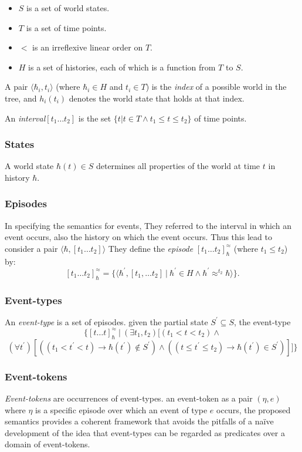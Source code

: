 \begin{itemize}
	\item $S$ is a set of world states.
	\item $T$ is a set of time points.
	\item $<$ is an irreflexive linear order on $T$.
	\item $H$ is a set of histories, each of which is a function from $T$ to $S$.
\end{itemize}

A pair $\langle \hbar_i, t_i \rangle$ (where $\hbar_i \in H$ and $t_i \in T$) is the \textit{index} of a possible world in the tree, and $h_i(t_i)$ denotes the world state that holds at that index.

An \textit{interval}$[t_1 \dots t_2]$ is the set $\{ t | t \in T \land t_1 \leq t \leq t_2\}$ of time points.


\subsubsection{States}
A world state $\hbar(t) \in S$ determines all properties of the world at time $t$ in history $\hbar$.

\subsubsection{Episodes}
In specifying the semantics for events, They referred to the interval in which an event occurs, also the history on which the event occurs.
Thus this lead to consider a pair $\langle \hbar, [t_1 \dots t_2] \rangle$
They define the \textit{episode} $[t_1 \dots t_2]_{\hbar}^{\approx}$ (where $t_1 \leq t_2$) by:
\[
	[t_1 \dots t_2]_{\hbar}^{\approx} = \{\langle \hbar^{\prime}, [t_1, \dots t_2] \ | \  \hbar^{\prime} \in H \land \hbar^{\prime} \approx^{t_2} \hbar \rangle\}.
\]

\subsubsection{Event-types}
An \textit{event-type} is a set of episodes. given the partial state $S^{\prime} \subseteq S$, the event-type
\[
	\{
	[t \dots t]_{\hbar}^{\approx} \ | \ (\exists t_1, t_2) [
			(t_1 < t < t_2) \land
			\]
			\[
			(\forall t^{\prime})[
					((t_1 < t^{\prime} < t) \to \hbar(t^{\prime}) \not\in S^{\prime}) \land
					((t \leq t^{\prime} \leq t_2) \to \hbar(t^{\prime}) \in S^{\prime})
				]
		]
	\}
\]

\subsubsection{Event-tokens}
\textit{Event-tokens} are occurrences of event-types.
an event-token as a pair $(\eta, e)$ where $\eta$ is a specific episode over which an event of type $e$ occurs, the proposed semantics provides a coherent framework that avoids the pitfalls of a naïve development of the idea that event-types can be regarded as predicates over a domain of event-tokens.

